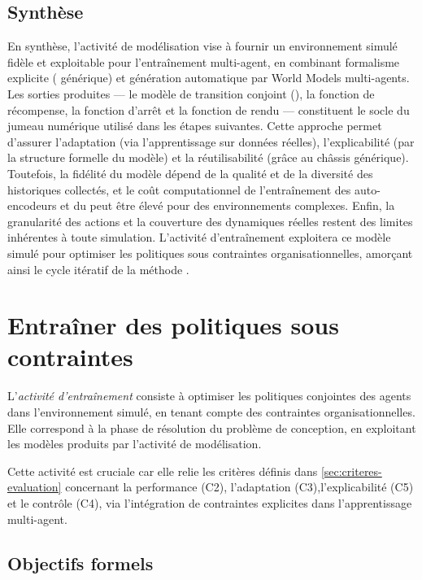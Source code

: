 \section{Synthèse}

\noindent
En synthèse, l’activité de modélisation vise à fournir un environnement simulé fidèle et exploitable pour l’entraînement multi-agent, en combinant formalisme explicite ( générique) et génération automatique par World Models multi-agents. Les sorties produites — le modèle de transition conjoint (), la fonction de récompense, la fonction d’arrêt et la fonction de rendu — constituent le socle du jumeau numérique utilisé dans les étapes suivantes. Cette approche permet d’assurer l’adaptation (via l’apprentissage sur données réelles), l’explicabilité (par la structure formelle du modèle) et la réutilisabilité (grâce au châssis générique). Toutefois, la fidélité du modèle dépend de la qualité et de la diversité des historiques collectés, et le coût computationnel de l’entraînement des auto-encodeurs et du  peut être élevé pour des environnements complexes. Enfin, la granularité des actions et la couverture des dynamiques réelles restent des limites inhérentes à toute simulation. L’activité d’entraînement exploitera ce modèle simulé pour optimiser les politiques sous contraintes organisationnelles, amorçant ainsi le cycle itératif de la méthode .

\clearpage
\thispagestyle{empty}
\null
\newpage

\chapter{Entraîner des politiques sous contraintes}
\label{chap:training}

L'\textit{activité d'entraînement} consiste à optimiser les politiques conjointes des agents dans l’environnement simulé, en tenant compte des contraintes organisationnelles.
Elle correspond à la phase de résolution du problème de conception, en exploitant les modèles produits par l’activité de modélisation.

Cette activité est cruciale car elle relie les critères définis dans \autoref{sec:criteres-evaluation} concernant la performance (C2), l’adaptation (C3),l’explicabilité (C5) et le contrôle (C4), via l’intégration de contraintes explicites dans l’apprentissage multi-agent.

\section*{Objectifs formels}

